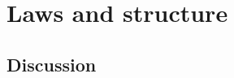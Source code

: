 \section{Laws and structure}

\subsection{Discussion}

\begin{comment}
this is part two of chapter seven in part one we have looked at several
examples of Mona's and we found that generalizing the monad type signature
led to very different types there are different properties of containers
some of them expressed iteration other expressed failures recovery
from flavors evaluation strategies and soon in this part I will talk
in more detail about the laws and structure of these containers of
these types and we will see why is it that flatmap type signature
which is kind of a little strange and bizarre maybe at first sight
gives rise to such a generalization we'll see that the properties
of Mona's are completely logically the derived from the properties
that the computations must have so let us think back to our examples
of Thunder block programs and let's for simplicity consider that we
are talking about the container such as list where the functor block
let's say of this kind expresses iteration over a list so we have
been here for example in nested iteration of some sort what will be
the properties of counter block programs that we expect to have the
main intuition is that when we write a line like this with the left
arrow which is in scala called a generator we expect that in the later
lines the value of x will go over items that are held in the container
see this is our main intuition so in particular we expect that if
we first say that X goes over items in container 1 and then we make
some transformation of that X let's say using a function f then we
expect and then we continue with that in some other way with some
other generator we expect that the result will be the same as if we
first transformed container 1 and replaced all its items by the transformed
items by the f of X and then continued so so in other words we expect
that this code and whatever follows it should be equivalent to this
code and whatever follows it now if you remember the main intuition
behind how to interpret the generator lines each generator line together
with all the code that follows it defines a new container which would
be a result of some flat map call so let's write down what that flat

\end{comment}
